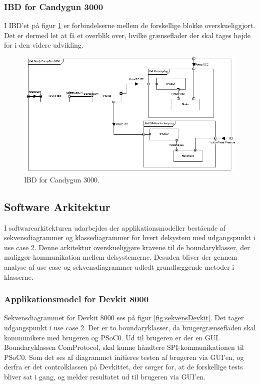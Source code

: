 \subsubsection{IBD for Candygun 3000}
I IBD'et på figur \ref{fig:IBD} er forbindelserne mellem de forskellige blokke overskueliggjort. Det er dermed let at få et overblik over, hvilke grænseflader der skal tages højde for i den videre udvikling. 

\begin{figure}[H]
	\centering
	\includegraphics[width=\textwidth]{Systemarkitektur/images/GoofycandygunIBD.png}
	\caption{IBD for Candygun 3000.}
	\label{fig:IBD}
\end{figure}

\subsection{Software Arkitektur}
I softwarearkitekturen udarbejdes der applikationsmodeller bestående af sekvensdiagrammer og klassediagrammer for hvert delsystem med udgangspunkt i use case 2. Denne arkitektur overskueliggøre kravene til de boundaryklasser, der muliggør kommunikation mellem delsystemerne. Desuden bliver der gennem analyse af use case og sekvensdiagrammer udledt grundlæggende metoder i klasserne.  

\subsubsection{Applikationsmodel for Devkit 8000}
Sekvensdiagrammet for Devkit 8000 ses på figur \ref{fig:sekvensDevkit}. Det tager udgangspunkt i use case 2. Der er to boundaryklasser, da brugergrænsefladen skal kommunikere med brugeren og PSoC0. Ud til brugeren er der en GUI. Boundaryklassen ComProtocol, skal kunne håndtere SPI-kommunikationen til PSoC0. Som det ses af diagrammet initieres testen af brugeren via GUI'en, og derfra er det controlklassen på Devkittet, der sørger for, at de forskellige tests bliver sat i gang, og melder resultatet ud til brugeren via GUI'en.

